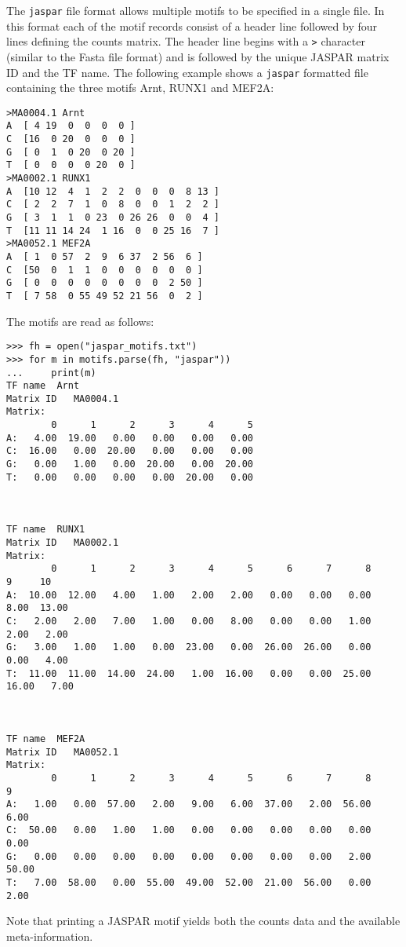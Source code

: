 The \verb+jaspar+ file format allows multiple motifs to be specified in a single file. In this format each of the motif records consist of a header line followed by four lines defining the counts matrix. The header line begins with a \verb+>+ character (similar to the Fasta file format) and is followed by the unique JASPAR matrix ID and the TF name. The following example shows a \verb+jaspar+ formatted file containing the three motifs Arnt, RUNX1 and MEF2A:
\begin{verbatim}
>MA0004.1 Arnt
A  [ 4 19  0  0  0  0 ]
C  [16  0 20  0  0  0 ]
G  [ 0  1  0 20  0 20 ]
T  [ 0  0  0  0 20  0 ]
>MA0002.1 RUNX1
A  [10 12  4  1  2  2  0  0  0  8 13 ]
C  [ 2  2  7  1  0  8  0  0  1  2  2 ]
G  [ 3  1  1  0 23  0 26 26  0  0  4 ]
T  [11 11 14 24  1 16  0  0 25 16  7 ]
>MA0052.1 MEF2A
A  [ 1  0 57  2  9  6 37  2 56  6 ]
C  [50  0  1  1  0  0  0  0  0  0 ]
G  [ 0  0  0  0  0  0  0  0  2 50 ]
T  [ 7 58  0 55 49 52 21 56  0  2 ]
\end{verbatim}
The motifs are read as follows:
\begin{verbatim}
>>> fh = open("jaspar_motifs.txt")
>>> for m in motifs.parse(fh, "jaspar"))
...     print(m)
TF name	 Arnt
Matrix ID	MA0004.1
Matrix:
        0      1      2      3      4      5
A:   4.00  19.00   0.00   0.00   0.00   0.00
C:  16.00   0.00  20.00   0.00   0.00   0.00
G:   0.00   1.00   0.00  20.00   0.00  20.00
T:   0.00   0.00   0.00   0.00  20.00   0.00



TF name	 RUNX1
Matrix ID	MA0002.1
Matrix:
        0      1      2      3      4      5      6      7      8      9     10
A:  10.00  12.00   4.00   1.00   2.00   2.00   0.00   0.00   0.00   8.00  13.00
C:   2.00   2.00   7.00   1.00   0.00   8.00   0.00   0.00   1.00   2.00   2.00
G:   3.00   1.00   1.00   0.00  23.00   0.00  26.00  26.00   0.00   0.00   4.00
T:  11.00  11.00  14.00  24.00   1.00  16.00   0.00   0.00  25.00  16.00   7.00



TF name	 MEF2A
Matrix ID	MA0052.1
Matrix:
        0      1      2      3      4      5      6      7      8      9
A:   1.00   0.00  57.00   2.00   9.00   6.00  37.00   2.00  56.00   6.00
C:  50.00   0.00   1.00   1.00   0.00   0.00   0.00   0.00   0.00   0.00
G:   0.00   0.00   0.00   0.00   0.00   0.00   0.00   0.00   2.00  50.00
T:   7.00  58.00   0.00  55.00  49.00  52.00  21.00  56.00   0.00   2.00
\end{verbatim}

Note that printing a JASPAR motif yields both the counts data and the available meta-information.

